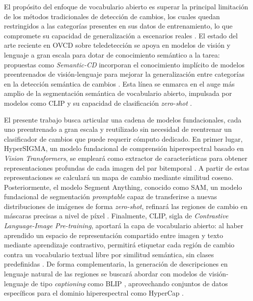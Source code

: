 \documentclass[12pt,onecolumn]{IEEEtran}
\begin{document}
El propósito del enfoque de vocabulario abierto es superar la principal limitación de los métodos tradicionales de detección de cambios, los cuales quedan restringidos a las categorías presentes en sus datos de entrenamiento, lo que compromete su capacidad de generalización a escenarios reales \cite{zhu2025semanticcd}. El estado del arte reciente en OVCD sobre teledetección se apoya en modelos de visión y lenguaje a gran escala para dotar de conocimiento semántico a la tarea: propuestas como \textit{Semantic-CD} incorporan el conocimiento implícito de modelos preentrenados de visión-lenguaje para mejorar la generalización entre categorías en la detección semántica de cambios \cite{zhu2025semanticcd}. Esta línea se enmarca en el auge más amplio de la segmentación semántica de vocabulario abierto, impulsada por modelos como CLIP y su capacidad de clasificación \textit{zero-shot} \cite{radford2021clip}.

El presente trabajo busca articular una cadena de modelos fundacionales, cada uno preentrenado a gran escala y reutilizado sin necesidad de reentrenar un clasificador de cambios que puede requerir cómputo dedicado. En primer lugar, HyperSIGMA, un modelo fundacional de comprensión hiperespectral basado en \textit{Vision Transformers}, se empleará como extractor de características para obtener representaciones profundas de cada imagen del par bitemporal \cite{wang2024hypersigma}. A partir de estas representaciones se calculará un mapa de cambio mediante similitud coseno. Posteriormente, el modelo Segment Anything, conocido como SAM, un modelo fundacional de segmentación \textit{promptable} capaz de transferirse a nuevas distribuciones de imágenes de forma \textit{zero-shot}, refinará las regiones de cambio en máscaras precisas a nivel de píxel \cite{kirillov2023sam}. Finalmente, CLIP, sigla de \textit{Contrastive Language-Image Pre-training}, aportará la capa de vocabulario abierto: al haber aprendido un espacio de representación compartido entre imagen y texto mediante aprendizaje contrastivo, permitirá etiquetar cada región de cambio contra un vocabulario textual libre por similitud semántica, sin clases predefinidas \cite{radford2021clip}. De forma complementaria, la generación de descripciones en lenguaje natural de las regiones se buscará abordar con modelos de visión-lenguaje de tipo \textit{captioning} como BLIP \cite{li2022blip}, aprovechando conjuntos de datos específicos para el dominio hiperespectral como HyperCap \cite{das2025hypercap}.
\end{document}
